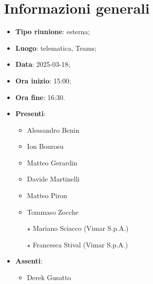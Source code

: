 \section{Informazioni generali}
\begin{itemize}
  \item \textbf{Tipo riunione}: esterna;
  \item \textbf{Luogo}: telematica, Teams;
  \item \textbf{Data}: 2025-03-18;
  \item \textbf{Ora inizio}: 15:00;
  \item \textbf{Ora fine}: 16:30.
  
  \item \textbf{Presenti}:
  \begin{itemize}
    \item Alessandro Benin
    \item Ion Bourosu
    \item Matteo Gerardin
    \item Davide Martinelli
    \item Matteo Piron
    \item Tommaso Zocche
    \item[$\star$] Mariano Sciacco (Vimar S.p.A.)
    \item[$\star$] Francesca Stival (Vimar S.p.A.)
  \end{itemize}

  \item \textbf{Assenti}:
  \begin{itemize}
      \item Derek Gusatto
  \end{itemize}
 
\end{itemize}